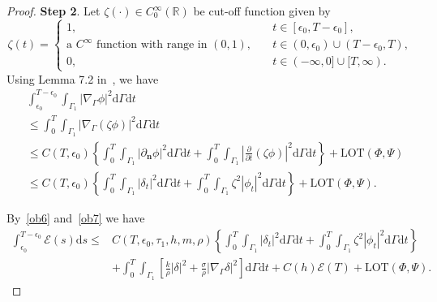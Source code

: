 \documentclass[10pt]{elsarticle}
\begin{document}
\begin{proof}
\textbf{Step 2}. Let $\zeta(\cdot)\in C_{0}^{\infty}(\mathbb{R})$ be cut-off function given by
\begin{equation*} 
\zeta(t)=\left
    \{
        \begin{array}{ll}
            1,\quad &t\in[\epsilon_0, T-\epsilon_0],\\
            \textrm{a $C^{\infty}$ function with range in $(0, 1)$}, \quad &t\in(0, \epsilon_0)\cup (T-\epsilon_0, T),\\
            0, \quad &t\in(-\infty, 0]\cup [T, \infty).    
        \end{array} 
\right.
\end{equation*}
Using Lemma 7.2 in~\cite{LT}, we have
\begin{equation} \label{ob7}
\begin{aligned}
	&\int_{\epsilon_0}^{T-\epsilon_0}\int_{\Gamma_1} |\nabla_{\Gamma}\phi|^2 \mathrm{d}\Gamma \mathrm{d}t\\
	&\leq \int_{0}^{T}\int_{\Gamma_1} |\nabla_{\Gamma}(\zeta\phi)|^2 \mathrm{d}\Gamma \mathrm{d}t\\
	&\leq C(T, \epsilon_0)\left\{\int_{0}^{T}\int_{\Gamma_1} |{\partial_ \mathbf{n}\phi}|^2 \mathrm{d}\Gamma \mathrm{d}t +\int_{0}^{T}\int_{\Gamma_1}| \frac{\partial}{\partial t}(\zeta \phi)|^2 \mathrm{d}\Gamma \mathrm{d}t\right\}+\textrm{LOT}(\Phi, \Psi)\\
	&\leq C(T, \epsilon_0)\left\{\int_{0}^{T}\int_{\Gamma_1} |\delta_t|^2 \mathrm{d}\Gamma \mathrm{d}t +\int_{0}^{T}\int_{\Gamma_1} \zeta^2|\phi_t|^2 \mathrm{d}\Gamma \mathrm{d}t\right\}+\textrm{LOT}(\Phi, \Psi).
\end{aligned}
\end{equation}

By~\eqref{ob6} and~\eqref{ob7} we have
\begin{equation}\label{ob8}
\begin{split}
\int_{\epsilon_0}^{T-\epsilon_0}\mathcal{E}(s)\mathrm{d}s \leqslant &C(T, \epsilon_0, \tau_1, h, m, \rho)\left\{\int_{0}^{T}\int_{\Gamma_1} |\delta_t|^2 \mathrm{d}\Gamma \mathrm{d}t +\int_{0}^{T}\int_{\Gamma_1}\zeta^2|\phi_t|^2 \mathrm{d}\Gamma \mathrm{d}t\right\}\\
&+ \int_{0}^{T}\int_{\Gamma_1}\left[\frac{k}{\rho} |\delta|^2 + \frac{\sigma}{\rho}|\nabla_{\Gamma}\delta|^2\right]\mathrm{d}\Gamma \mathrm{d}t+C(h)\mathcal{E}(T) +\textrm{LOT}(\Phi, \Psi).
\end{split}
\end{equation}


\end{proof}
\end{document}
